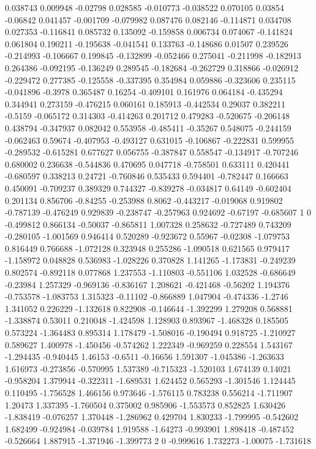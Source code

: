0.038743 0.009948   
-0.02798 0.028585   
-0.010773 -0.038522   
0.070105 0.03854   
-0.06842 0.041457   
-0.001709 -0.079982   
0.087476 0.082146   
-0.114871 0.034708   
0.027353 -0.116841   
0.085732 0.135092   
-0.159858 0.006734   
0.074067 -0.141824   
0.061804 0.190211   
-0.195638 -0.041541   
0.133763 -0.148686   
0.01507 0.239526   
-0.214993 -0.106667   
0.199845 -0.132899   
-0.052466 0.275041   
-0.211998 -0.182913   
0.264386 -0.092195   
-0.136249 0.289545   
-0.182684 -0.262729   
0.318866 -0.026912   
-0.229472 0.277385   
-0.125558 -0.337395   
0.354984 0.059886   
-0.323606 0.235115   
-0.041896 -0.3978   
0.365487 0.16254   
-0.409101 0.161976   
0.064184 -0.435294   
0.344941 0.273159   
-0.476215 0.060161   
0.185913 -0.442534   
0.29037 0.382211   
-0.5159 -0.065172   
0.314303 -0.414263   
0.201712 0.479283   
-0.520675 -0.206148   
0.438794 -0.347937   
0.082042 0.553958   
-0.485411 -0.35267   
0.548075 -0.244159   
-0.062463 0.59674   
-0.407953 -0.493127   
0.631015 -0.106867   
-0.222831 0.599955   
-0.289532 -0.615281   
0.677627 0.056755   
-0.387847 0.558547   
-0.134917 -0.707246   
0.680002 0.236638   
-0.544836 0.470695   
0.047718 -0.758501   
0.633111 0.420441   
-0.680597 0.338213   
0.24721 -0.760846   
0.535433 0.594401   
-0.782447 0.166663   
0.450091 -0.709237   
0.389329 0.744327   
-0.839278 -0.034817   
0.64149 -0.602404   
0.201134 0.856706   
-0.84255 -0.253988   
0.8062 -0.443217   
-0.019068 0.919802   
-0.787139 -0.476249   
0.929839 -0.238747   
-0.257963 0.924692   
-0.67197 -0.685607   
1 0   
-0.499812 0.866134   
-0.50037 -0.865811   
1.007328 0.258632   
-0.727489 0.743209   
-0.280105 -1.001569   
0.946414 0.520289   
-0.923672 0.55967   
-0.02308 -1.079753   
0.816449 0.766688   
-1.072128 0.323948   
0.255286 -1.090518   
0.621565 0.979417   
-1.158972 0.048828   
0.536983 -1.028226   
0.370828 1.141265   
-1.173831 -0.249239   
0.802574 -0.892118   
0.077868 1.237553   
-1.110803 -0.551106   
1.032528 -0.686649   
-0.23984 1.257329   
-0.969136 -0.836167   
1.208621 -0.421468   
-0.56202 1.194376   
-0.753578 -1.083753   
1.315323 -0.11102   
-0.866889 1.047904   
-0.474336 -1.2746   
1.341052 0.226229   
-1.132618 0.822908   
-0.146644 -1.392299   
1.279208 0.568881   
-1.338874 0.53011   
0.210048 -1.424598   
1.128903 0.893967   
-1.468328 0.185505   
0.573224 -1.364483   
0.895314 1.178479   
-1.508016 -0.190494   
0.918725 -1.210927   
0.589627 1.400978   
-1.450456 -0.574262   
1.222349 -0.969259   
0.228554 1.543167   
-1.294435 -0.940445   
1.46153 -0.6511   
-0.16656 1.591307   
-1.045386 -1.263633   
1.616973 -0.273856   
-0.570995 1.537389   
-0.715323 -1.520103   
1.674139 0.14021   
-0.958204 1.379944   
-0.322311 -1.689531   
1.624452 0.565293   
-1.301546 1.124445   
0.110495 -1.756528   
1.466156 0.973646   
-1.576115 0.783238   
0.556214 -1.711907   
1.20473 1.337395   
-1.760504 0.375002   
0.985906 -1.553573   
0.852825 1.630426   
-1.838419 -0.076257   
1.370448 -1.286962   
0.429704 1.830233   
-1.799995 -0.542602   
1.682499 -0.924984   
-0.039784 1.919588   
-1.64273 -0.993901   
1.898418 -0.487452   
-0.526664 1.887915   
-1.371946 -1.399773   
2 0   
-0.999616 1.732273   
-1.00075 -1.731618   
